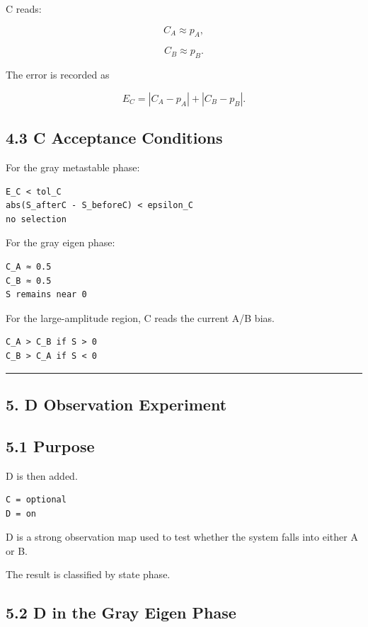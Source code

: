 \documentclass{article}
\begin{document}
C reads:

\[
C_A \approx p_A,
\]

\[
C_B \approx p_B.
\]

The error is recorded as

\[
E_C = |C_A-p_A| + |C_B-p_B|.
\]

\subsection{4.3 C Acceptance Conditions}\label{c-acceptance-conditions}

For the gray metastable phase:

\begin{verbatim}
E_C < tol_C
abs(S_afterC - S_beforeC) < epsilon_C
no selection
\end{verbatim}

For the gray eigen phase:

\begin{verbatim}
C_A ≈ 0.5
C_B ≈ 0.5
S remains near 0
\end{verbatim}

For the large-amplitude region, C reads the current A/B bias.

\begin{verbatim}
C_A > C_B if S > 0
C_B > C_A if S < 0
\end{verbatim}

\begin{center}\rule{0.5\linewidth}{0.5pt}\end{center}

\subsection{5. D Observation Experiment}\label{d-observation-experiment}

\subsection{5.1 Purpose}\label{purpose-3}

D is then added.

\begin{verbatim}
C = optional
D = on
\end{verbatim}

D is a strong observation map used to test whether the system falls into
either A or B.

The result is classified by state phase.

\subsection{5.2 D in the Gray Eigen
Phase}\label{d-in-the-gray-eigen-phase}
\end{document}
